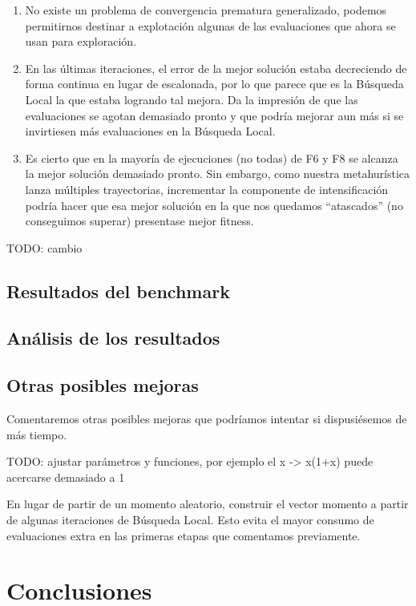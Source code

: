 \documentclass{article}
\begin{document}
\begin{enumerate}
	\item No existe un problema de convergencia prematura generalizado, podemos permitirnos destinar a explotación algunas de las evaluaciones
	 que ahora se usan para exploración.
	\item En las últimas iteraciones, el error de la mejor solución estaba decreciendo de forma continua en lugar de escalonada, por lo que
	 parece que es la Búsqueda Local la que estaba logrando tal mejora. Da la impresión de que las evaluaciones se agotan demasiado pronto y
	 que podría mejorar aun más si se invirtiesen más evaluaciones en la Búsqueda Local.
	\item Es cierto que en la mayoría de ejecuciones (no todas) de F6 y F8 se alcanza la mejor solución demasiado pronto. Sin embargo, como
	nuestra metahurística lanza múltiples trayectorias, incrementar la componente de intensificación podría hacer que esa mejor solución en la
	 que nos quedamos ``atascados'' (no conseguimos superar) presentase mejor fitness.
\end{enumerate}

TODO: cambio

\subsection{Resultados del benchmark}

\subsection{Análisis de los resultados}

\subsection{Otras posibles mejoras}

Comentaremos otras posibles mejoras que podríamos intentar si dispusiésemos de más tiempo.

TODO: ajustar parámetros y funciones, por ejemplo el x -> x(1+x) puede acercarse demasiado a 1

En lugar de partir de un momento aleatorio, construir el vector momento a partir de algunas iteraciones de Búsqueda Local. Esto evita
el mayor consumo de evaluaciones extra en las primeras etapas que comentamos previamente. 

\section{Conclusiones}
\end{document}
